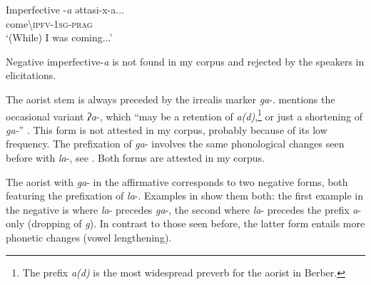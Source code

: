 \documentclass[output=paper,colorlinks,citecolor=brown]{langscibook}
\begin{document}
\ea\label{ex:siw:4}Imperfective -\textit{a}\newline
    \gll əttasi-x-a...\\
         come{\textbackslash}\textsc{ipfv-1sg-prag}\\
    \glt ‘(While) I was coming...’
\z


Negative imperfective-\textit{a} is not found in my corpus and rejected by the speakers in elicitations. 

The aorist stem is always preceded by the irrealis marker \textit{ga}{}-. \citet[187]{Souag2013} mentions the occasional variant \textit{ʔa}{}-, which “may be a retention of \textit{a(d)},\footnote{The prefix \textit{a(d)} is the most widespread preverb for the aorist in Berber.} or just a shortening of \textit{ga-}” . This form is not attested in my corpus, probably because of its low frequency. The prefixation of \textit{ga}{}- involves the same phonological changes seen before with \textit{la}{}-, see . 
Both forms are attested in my corpus. 



The aorist with \textit{ga}{}- in the affirmative corresponds to two negative forms, both featuring the prefixation of \textit{la}{}-. Examples in  show them both: the first example in the negative is where \textit{la}{}- precedes \textit{ga}{}-, the second where \textit{la}{}- precedes the prefix \textit{a}{}- only (dropping of \textit{g}). In contrast to those seen before, the latter form entails more phonetic changes (vowel lengthening).
\end{document}
